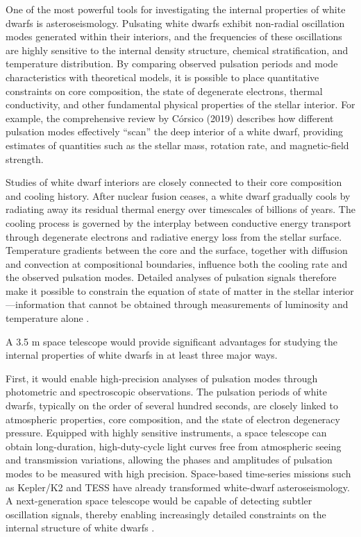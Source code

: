 One of the most powerful tools for investigating the internal properties of white dwarfs is asteroseismology. Pulsating white dwarfs exhibit non-radial oscillation modes generated within their interiors, and the frequencies of these oscillations are highly sensitive to the internal density structure, chemical stratification, and temperature distribution. By comparing observed pulsation periods and mode characteristics with theoretical models, it is possible to place quantitative constraints on core composition, the state of degenerate electrons, thermal conductivity, and other fundamental physical properties of the stellar interior. For example, the comprehensive review by Córsico (2019) \cite{corsico2019} describes how different pulsation modes effectively ``scan'' the deep interior of a white dwarf, providing estimates of quantities such as the stellar mass, rotation rate, and magnetic-field strength.

Studies of white dwarf interiors are closely connected to their core composition and cooling history. After nuclear fusion ceases, a white dwarf gradually cools by radiating away its residual thermal energy over timescales of billions of years. The cooling process is governed by the interplay between conductive energy transport through degenerate electrons and radiative energy loss from the stellar surface. Temperature gradients between the core and the surface, together with diffusion and convection at compositional boundaries, influence both the cooling rate and the observed pulsation modes. Detailed analyses of pulsation signals therefore make it possible to constrain the equation of state of matter in the stellar interior---information that cannot be obtained through measurements of luminosity and temperature alone \cite{bedard2024}.

A 3.5 m space telescope would provide significant advantages for studying the internal properties of white dwarfs in at least three major ways.

First, it would enable high-precision analyses of pulsation modes through photometric and spectroscopic observations. The pulsation periods of white dwarfs, typically on the order of several hundred seconds, are closely linked to atmospheric properties, core composition, and the state of electron degeneracy pressure. Equipped with highly sensitive instruments, a space telescope can obtain long-duration, high-duty-cycle light curves free from atmospheric seeing and transmission variations, allowing the phases and amplitudes of pulsation modes to be measured with high precision. Space-based time-series missions such as Kepler/K2 and TESS have already transformed white-dwarf asteroseismology. A next-generation space telescope would be capable of detecting subtler oscillation signals, thereby enabling increasingly detailed constraints on the internal structure of white dwarfs \cite{corsico2022}.

